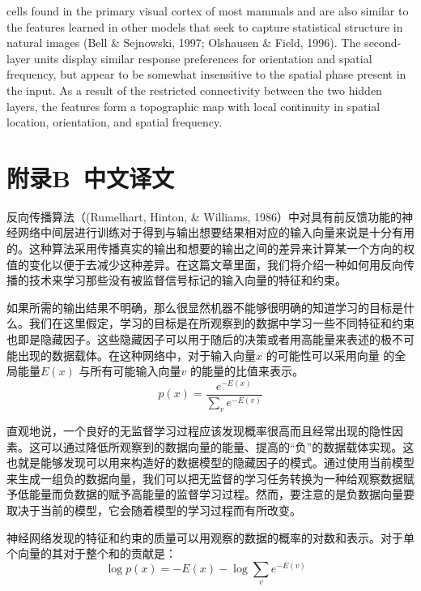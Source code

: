 {cells found in the primary visual cortex of most mammals and are also similar to the features learned in other models that seek to capture statistical structure in natural images (Bell \& Sejnowski, 1997; Olshausen \& Field, 1996). The second-layer units display similar response preferences for orientation and spatial frequency, but appear to be somewhat insensitive to the spatial phase present in the input. As a result of the restricted connectivity between the two hidden layers, the features form a topographic map with local continuity in spatial location, orientation, and spatial frequency.}


\section {附录B~中文译文}
\setcounter{equation}{0}
\par{反向传播算法（(Rumelhart, Hinton, \& Williams, 1986）中对具有前反馈功能的神经网络中间层进行训练对于得到与输出想要结果相对应的输入向量来说是十分有用的。这种算法采用传播真实的输出和想要的输出之间的差异来计算某一个方向的权值的变化以便于去减少这种差异。在这篇文章里面，我们将介绍一种如何用反向传播的技术来学习那些没有被监督信号标记的输入向量的特征和约束。}
\par{如果所需的输出结果不明确，那么很显然机器不能够很明确的知道学习的目标是什么。我们在这里假定，学习的目标是在所观察到的数据中学习一些不同特征和约束也即是隐藏因子。这些隐藏因子可以用于随后的决策或者用高能量来表述的极不可能出现的数据载体。在这种网络中，对于输入向量$x$ 的可能性可以采用向量 的全局能量$E(x)$ 与所有可能输入向量$v$ 的能量的比值来表示。
\begin{equation}\label{equation1}p(x) = \frac{{{e^{ - E(x)}}}}{{\sum\nolimits_v {{e^{ - E(v)}}} }}\end{equation}
}

\par{直观地说，一个良好的无监督学习过程应该发现概率很高而且经常出现的隐性因素。这可以通过降低所观察到的数据向量的能量、提高的“负”的数据载体实现。这也就是能够发现可以用来构造好的数据模型的隐藏因子的模式。通过使用当前模型来生成一组负的数据向量，我们可以把无监督的学习任务转换为一种给观察数据赋予低能量而负数据的赋予高能量的监督学习过程。然而，要注意的是负数据向量要取决于当前的模型，它会随着模型的学习过程而有所改变。}
\par{
神经网络发现的特征和约束的质量可以用观察的数据的概率的对数和表示。对于单个向量的其对于整个和的贡献是：
\begin{equation}\label{equation2}\log p(x) =  - E(x) - \log \sum\limits_v {{e^{ - E(v)}}} \;\;\;\end{equation}
}

